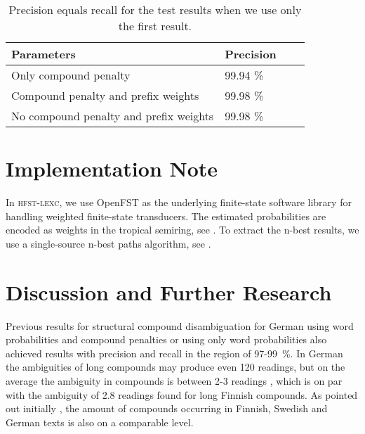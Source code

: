 \documentclass[11pt]{article}
\begin{document}
\begin{table}[htb!]
  \begin{small}
    \begin{tabular}{|l|l|l|l|}
      \hline 
      Parameters & Precision \\
      \hline 
      Only compound penalty & 99.94 \% \\
      Compound penalty and prefix weights & 99.98 \% \\
      No compound penalty and prefix weights & 99.98 \% \\
      \hline 
    \end{tabular}
    \caption{Precision equals recall for the test results when we use
      only the first result.
    }\label{tab:results}
  \end{small}
\end{table}

\section{Implementation Note}
\label{Sect6}

In \textsc{hfst-lexc}, we use OpenFST \cite{openfst/2007} as the underlying
finite-state software library for handling weighted finite-state
transducers. The estimated probabilities are encoded as weights in the
tropical semiring, see \cite{mohri/1997}. To extract the n-best
results, we use a single-source n-best paths algorithm, see
\cite{mohri/2002}.

\section{Discussion and Further Research}
\label{Sect7}

Previous results for structural compound disambiguation for German
using word probabilities and compound penalties \cite{schiller/2005} or
using only word probabilities \cite{marek/2006} also achieved results
with precision and recall in the region of 97-99~\%. In German the
ambiguities of long compounds may produce even 120 readings, but on
the average the ambiguity in compounds is between 2-3 readings
\cite{schiller/2005}, which is on par with the ambiguity of 2.8
readings found for long Finnish compounds. As pointed out initially
\cite{hedlund/2002}, the amount of compounds occurring in Finnish,
Swedish and German texts is also on a comparable level.
\end{document}
